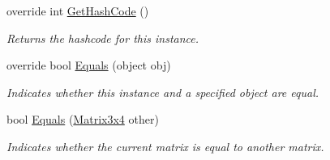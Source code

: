 \begin{DoxyCompactItemize}
override int \hyperlink{struct_open_t_k_1_1_matrix3x4_a457ce2eb0b49a6997fe7858e643e4566}{Get\-Hash\-Code} ()
\begin{DoxyCompactList}\small\item\em Returns the hashcode for this instance. \end{DoxyCompactList}\item 
override bool \hyperlink{struct_open_t_k_1_1_matrix3x4_a5214f3fbc8d46e4cacc0c0d0003d91e3}{Equals} (object obj)
\begin{DoxyCompactList}\small\item\em Indicates whether this instance and a specified object are equal. \end{DoxyCompactList}\item 
bool \hyperlink{struct_open_t_k_1_1_matrix3x4_a7e158c38b1ecee856125f5cca3635a6d}{Equals} (\hyperlink{struct_open_t_k_1_1_matrix3x4}{Matrix3x4} other)
\begin{DoxyCompactList}\small\item\em Indicates whether the current matrix is equal to another matrix. \end{DoxyCompactList}\end{DoxyCompactItemize}
